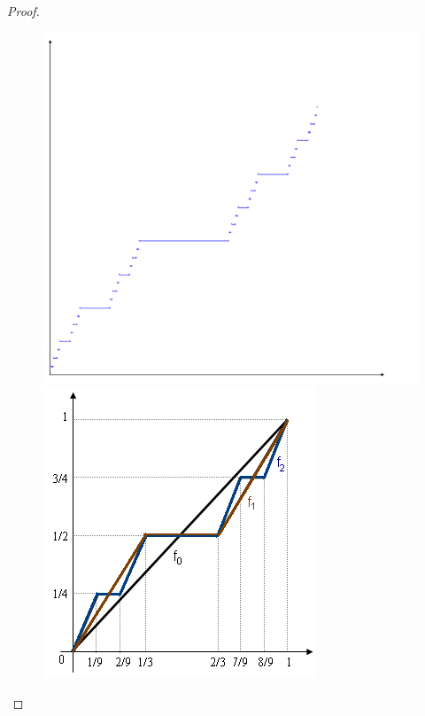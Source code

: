 \documentclass[hyperref,a4paper,UTF8]{ctexart}
\begin{document}
\begin{proof}
\begin{figure}[htbp]
  \centering
  \begin{minipage}{0.3\textwidth}
      \centering
      \includegraphics[width=\textwidth]{image/cantor_lebesgue.png}
  \end{minipage}
  \begin{minipage}{0.3\textwidth}
      \centering
      \includegraphics[width=\textwidth]{image/Cantor_function_sequence.png}
  \end{minipage}
\end{figure}



\end{proof}
\end{document}
